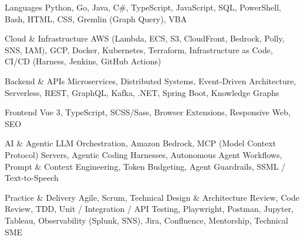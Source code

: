 
\begin{cvskills}

  \cvskill
    {Languages}
    {Python, Go, Java, C\#, TypeScript, JavaScript, SQL, PowerShell, Bash, HTML, CSS, Gremlin (Graph Query), VBA}

  \cvskill
    {Cloud \& Infrastructure}
    {AWS (Lambda, ECS, S3, CloudFront, Bedrock, Polly, SNS, IAM), GCP, Docker, Kubernetes, Terraform, Infrastructure as Code, CI/CD (Harness, Jenkins, GitHub Actions)}

  \cvskill
    {Backend \& APIs}
    {Microservices, Distributed Systems, Event-Driven Architecture, Serverless, REST, GraphQL, Kafka, .NET, Spring Boot, Knowledge Graphs}

  \cvskill
    {Frontend}
    {Vue 3, TypeScript, SCSS/Sass, Browser Extensions, Responsive Web, SEO}

  \cvskill
    {AI \& Agentic}
    {LLM Orchestration, Amazon Bedrock, MCP (Model Context Protocol) Servers, Agentic Coding Harnesses, Autonomous Agent Workflows, Prompt \& Context Engineering, Token Budgeting, Agent Guardrails, SSML / Text-to-Speech}

  \cvskill
    {Practice \& Delivery}
    {Agile, Scrum, Technical Design \& Architecture Review, Code Review, TDD, Unit / Integration / API Testing, Playwright, Postman, Jupyter, Tableau, Observability (Splunk, SNS), Jira, Confluence, Mentorship, Technical SME}

\end{cvskills}
